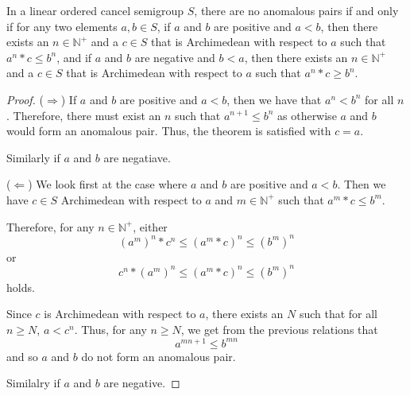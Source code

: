 \begin{theorem}
In a linear ordered cancel semigroup $S$, there are no anomalous pairs
if and only if
for any two elements $a,b\in S$,
if $a$ and $b$ are positive and $a < b$, then there exists an $n \in \mathbb{N}^+$ and
a $c\in S$ that is Archimedean with respect to $a$ such that $a^n * c \le b^n$,
and if $a$ and $b$ are negative and $b < a$, then there exists an $n\in \mathbb{N}^+$ and
a $c\in S$ that is Archimedean with respect to $a$ such that $a^n *c \ge b^n$.
\end{theorem}
\begin{proof}
($\Rightarrow$)
If $a$ and $b$ are positive and $a < b$, then we have that $a^n < b^n$ for all $n$.
Therefore, there must exist an $n$ such that $a^{n+1} \le b^n$
as otherwise $a$ and $b$ would form an anomalous pair.
Thus, the theorem is satisfied with $c = a$.

Similarly if $a$ and $b$ are negatiave.

($\Leftarrow$)
We look first at the case where $a$ and $b$ are positive and $a < b$.
Then we have $c\in S$ Archimedean with respect to $a$ and $m\in \mathbb{N}^+$ such that
$a^m * c \le b^m$.

Therefore, for any $n \in \mathbb{N}^+$,
either
\[(a^m)^n * c^n \le (a^m*c)^n \le (b^m)^n\]
or
\[c^n * (a^m)^n \le (a^m*c)^n \le (b^m)^n\]
holds.

Since $c$ is Archimedean with respect to $a$, there exists an $N$
such that for all $n \ge N$, $a < c^n$. Thus, for any $n \ge N$,
we get from the previous relations that
\[a^{mn + 1} \le b^{mn}\]
and so $a$ and $b$ do not form an anomalous pair.

Similalry if $a$ and $b$ are negative.
\end{proof}
